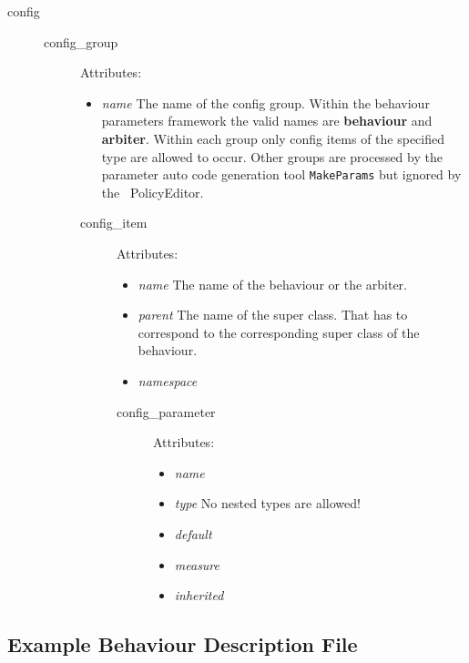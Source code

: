 \begin{description}
  \item[config]
  \begin{description}
  \item[config\_group]

    Attributes:
    \begin{itemize}
    \item \textit{name} The name of the config group. Within the
      behaviour parameters framework the valid names are \textbf{behaviour} and
      \textbf{arbiter}. Within each group only config items of the
      specified type are allowed to occur. Other groups are processed
      by the parameter auto code generation tool {\tt MakeParams} but
      ignored by the {\ PolicyEditor}.
    \end{itemize}

    \begin{description}
    \item[config\_item]

      Attributes:
      \begin{itemize}
      \item \textit{name} The name of the behaviour or the arbiter.
      \item \textit{parent} The name of the super class. That has to
        correspond to the corresponding super class of the behaviour.
      \item \textit{namespace}
      \end{itemize}
      \begin{description}
      \item[config\_parameter]

        Attributes:
        \begin{itemize}
        \item \textit{name}
        \item \textit{type} No nested types are allowed!
        \item \textit{default}
        \item \textit{measure}
        \item \textit{inherited}
        \end{itemize}
      \end{description}
    \end{description}
  \end{description}
\end{description}

\subsection{Example Behaviour Description File}

